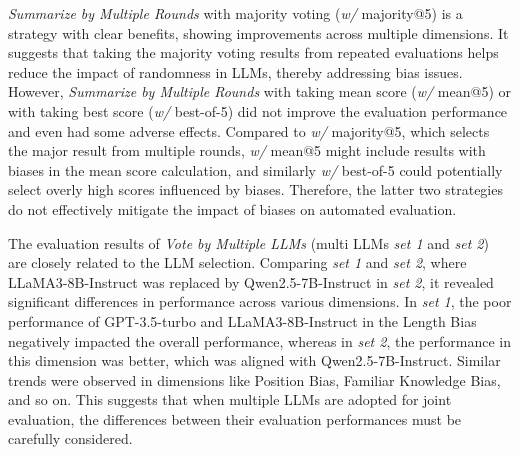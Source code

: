 \textit{Summarize by Multiple Rounds} with majority voting (\textit{w/} majority@5) is a strategy with clear benefits, showing improvements across multiple dimensions. It suggests that taking the majority voting results from repeated evaluations helps reduce the impact of randomness in LLMs, thereby addressing bias issues. However, \textit{Summarize by Multiple Rounds} with taking mean score (\textit{w/} mean@5) or with taking best score (\textit{w/} best-of-5) did not improve the evaluation performance and even had some adverse effects. Compared to \textit{w/} majority@5, which selects the major result from multiple rounds, \textit{w/} mean@5 might include results with biases in the mean score calculation, and similarly \textit{w/} best-of-5 could potentially select overly high scores influenced by biases. Therefore, the latter two strategies do not effectively mitigate the impact of biases on automated evaluation. 

The evaluation results of \textit{Vote by Multiple LLMs} (multi LLMs \textit{set 1} and \textit{set 2}) are closely related to the LLM selection. Comparing \textit{set 1} and \textit{set 2}, where LLaMA3-8B-Instruct was replaced by Qwen2.5-7B-Instruct in \textit{set 2}, it revealed significant differences in performance across various dimensions. In \textit{set 1}, the poor performance of GPT-3.5-turbo and LLaMA3-8B-Instruct in the Length Bias negatively impacted the overall performance, whereas in \textit{set 2}, the performance in this dimension was better, which was aligned with Qwen2.5-7B-Instruct. Similar trends were observed in dimensions like Position Bias, Familiar Knowledge Bias, and so on. This suggests that when multiple LLMs are adopted for joint evaluation, the differences between their evaluation performances must be carefully considered.

